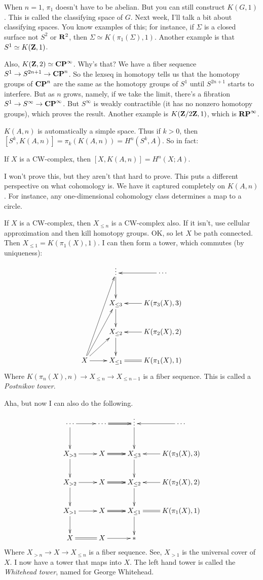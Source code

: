 	When $n=1$, $\pi_1$ doesn't have to be abelian. But you can still construct $K(G,1)$. This is called the classifying space of $G$. Next week, I'll talk a bit about classifying spaces. You know examples of this; for instance, if $\Sigma$ is a closed surface not $S^2$ or $\mathbf R^2$, then $\Sigma \simeq K(\pi_1(\Sigma),1)$. Another example is that $S^1\simeq K(\mathbf Z,1)$.
	
	Also, $K(\mathbf Z,2)\simeq \mathbf{CP}^\infty$. Why's that? We have a fiber sequence $S^1\to S^{2n+1}\to \mathbf{CP}^n$. So the lexseq in homotopy tells us that the homotopy groups of $\mathbf{CP}^n$ are the same as the homotopy groups of $S^1$ until $S^{2n+1}$ starts to interfere. But as $n$ grows, namely, if we take the limit, there's a fibration $S^1\to S^\infty\to \mathbf{CP}^\infty$. But $S^\infty$ is weakly contractible (it has no nonzero homotopy groups), which proves the result. Another example is $K(\mathbf Z/2\mathbf Z,1)$, which is $\mathbf{RP}^\infty$.

$K(A,n)$ is automatically a simple space. Thus if $k>0$, then $[S^k,K(A,n)] = \pi_k(K(A,n)) = H^n(S^k,A)$. So in fact:
\begin{theorem}
    If $X$ is a CW-complex, then $[X,K(A,n)] = H^n(X;A)$. 
\end{theorem}
I won't prove this, but they aren't that hard to prove. This puts a different perspective on what cohomology is. We have it captured completely on $K(A,n)$. For instance, any one-dimensional cohomology class determines a map to a circle.

If $X$ is a CW-complex, then $X_{\leq n}$ is a CW-complex also. If it isn't, use cellular approximation and then kill homotopy groups. OK, so let $X$ be path connected. Then $X_{\leq 1} = K(\pi_1(X),1)$. I can then form a tower, which commutes (by uniqueness):
\begin{equation*}
    \xymatrix{
	& \vdots\ar[d] & \cdots\ar[l]\\
	& X_{\leq 3}\ar[d]& K(\pi_3(X),3)\ar[l]\\
	& X_{\leq 2}\ar[d]& K(\pi_2(X),2)\ar[l]\\
	X\ar[r]\ar[ur]\ar[uur]\ar[uuur]& X_{\leq 1}\ar@{=}[r] & K(\pi_1(X),1)
    }
\end{equation*}
Where $K(\pi_n(X),n)\to X_{\leq n}\to X_{\leq n-1}$ is a fiber sequence. This is called a \emph{Postnikov tower}.

Aha, but now I can also do the following.
\begin{equation*}
    \xymatrix{
	\cdots\ar[r]\ar[d] & \cdots\ar[r]\ar@{=}[r] & \vdots\ar[d] & \cdots\ar[l]\\
	X_{>3}\ar[r]\ar[d] & X\ar[r]\ar@{=}[r] & X_{\leq 3}\ar[d]& K(\pi_3(X),3)\ar[l]\\
	X_{>2}\ar[r]\ar[d] & X\ar[r]\ar@{=}[r] & X_{\leq 2}\ar[d]& K(\pi_2(X),2)\ar[l]\\
	X_{>1}\ar[r]\ar[d] & X\ar[r]\ar@{=}[r] & X_{\leq 1}\ar@{=}[r]\ar[d] & K(\pi_1(X),1)\\
	X\ar@{=}[r] & X\ar[r] & \ast
    }
\end{equation*}
Where $X_{>n}\to X\to X_{\leq n}$ is a fiber sequence. See, $X_{>1}$ is the universal cover of $X$. I now have a tower that maps into $X$. The left hand tower is called the \emph{Whitehead tower}, named for George Whitehead.

